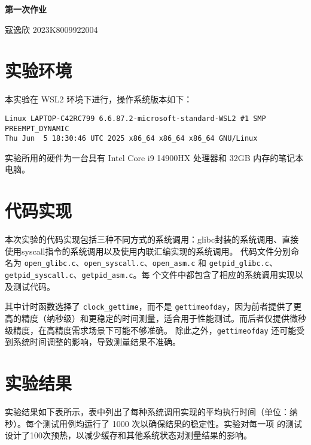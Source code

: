\documentclass[11pt]{article}
\begin{document}
    
\pagestyle{fancy}
\chead{}
    
\begin{center}
    {\LARGE \bf 第一次作业}\\
\end{center}
    \begin{kaishu}
        \hfill 寇逸欣 2023K8009922004
    \end{kaishu}

\section{实验环境}
本实验在 WSL2 环境下进行，操作系统版本如下：

\begin{verbatim}
Linux LAPTOP-C42RC799 6.6.87.2-microsoft-standard-WSL2 #1 SMP PREEMPT_DYNAMIC
Thu Jun  5 18:30:46 UTC 2025 x86_64 x86_64 x86_64 GNU/Linux
\end{verbatim}

实验所用的硬件为一台具有 Intel Core i9 14900HX 处理器和 32GB 内存的笔记本电脑。

\section{代码实现}
本次实验的代码实现包括三种不同方式的系统调用：glibc封装的系统调用、直接使用syscall指令的系统调用以及使用内联汇编实现的系统调用。
代码文件分别命名为 \texttt{open\_glibc.c}、\texttt{open\_syscall.c}、\texttt{open\_asm.c} 和 \texttt{getpid\_glibc.c}、\texttt{getpid\_syscall.c}、\texttt{getpid\_asm.c}。每
个文件中都包含了相应的系统调用实现以及测试代码。

其中计时函数选择了 \texttt{clock\_gettime}，而不是 \texttt{gettimeofday}，因为前者提供了更高的精度（纳秒级）和更稳定的时间测量，适合用于性能测试。而后者仅提供微秒级精度，在高精度需求场景下可能不够准确。
除此之外，\texttt{gettimeofday} 还可能受到系统时间调整的影响，导致测量结果不准确。

\section{实验结果}
实验结果如下表所示，表中列出了每种系统调用实现的平均执行时间（单位：纳秒）。每个测试用例均运行了 1000 次以确保结果的稳定性。实验对每一项
的测试设计了100次预热，以减少缓存和其他系统状态对测量结果的影响。
\end{document}
